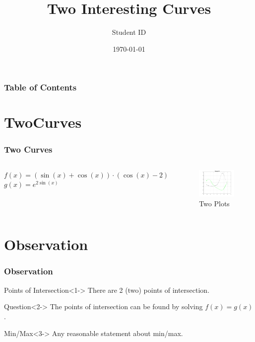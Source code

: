 \documentclass[11pt]{beamer}
\begin{document}
\title{Two Interesting Curves} 
\author{Student ID} 
\date{\today}

\begin{frame} \label{front} %
\titlepage


\end{frame}
\begin{frame} \frametitle{Table of Contents}\label{ToC} %

\tableofcontents

\end{frame}
\section{TwoCurves}
\begin{frame} \frametitle{Two Curves} \label{TC}%
\begin{columns}
$f(x)=(\sin(x)+\cos(x))\cdot (\cos(x)-2)$\\
$g(x)=e^{2\sin(x)}$

\begin{figure}
\centering
\includegraphics[scale=0.45]{twoPlots}
\caption{Two Plots}
\end{figure}
\end{columns}

\end{frame}
\section{Observation}
\begin{frame} \frametitle{Observation}\label{Obs}%
\begin{block}{Points of Intersection}<1->
There are 2 (two) points of intersection.
\end{block}

\begin{block}{Question}<2->
The points of intersection can be found by solving $f(x)=g(x)$.
\end{block}

\begin{block}{Min/Max}<3->
Any reasonable statement about min/max.
\end{block}

\end{frame}
\end{document}
